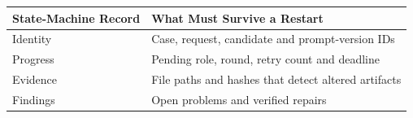 \begin{tabular}{@{}P{3.0cm}P{9.5cm}@{}}
\toprule
\textbf{State-Machine Record} & \textbf{What Must Survive a Restart} \\
\midrule
Identity & Case, request, candidate and prompt-version IDs \\
Progress & Pending role, round, retry count and deadline \\
Evidence & File paths and hashes that detect altered artifacts \\
Findings & Open problems and verified repairs \\
\bottomrule
\end{tabular}
